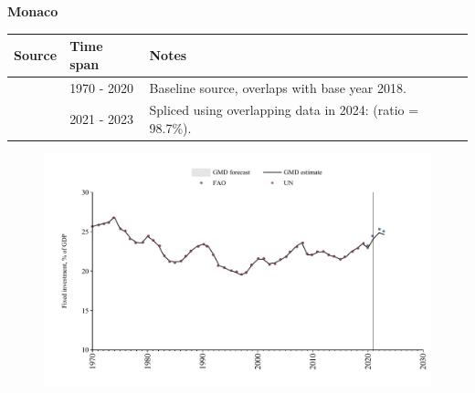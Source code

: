 \documentclass[12pt,a4paper,landscape]{article}
\begin{document}
\begin{adjustbox}{max totalsize={\paperwidth}{\paperheight},center}
\begin{minipage}[t][\textheight][t]{\textwidth}
\vspace*{0.5cm}
{}
\begin{center}
{\Large\bfseries Monaco}
\end{center}
\vspace{0.5cm}
\begin{table}[H]
\centering
\small
\begin{tabular}{|l|l|l|}
\hline
\textbf{Source} & \textbf{Time span} & \textbf{Notes} \\
\hline
\rowcolor{white}\cite{UN}& 1970 - 2020 &Baseline source, overlaps with base year 2018.\\
\rowcolor{lightgray}\cite{FAO}& 2021 - 2023 &Spliced using overlapping data in 2024: (ratio = 98.7\%).\\
\hline
\end{tabular}
\end{table}
\begin{figure}[H]
\centering
\includegraphics[width=\textwidth,height=0.6\textheight,keepaspectratio]{graphs/MCO_finv_GDP.pdf}
\end{figure}
\end{minipage}
\end{adjustbox}
\end{document}
